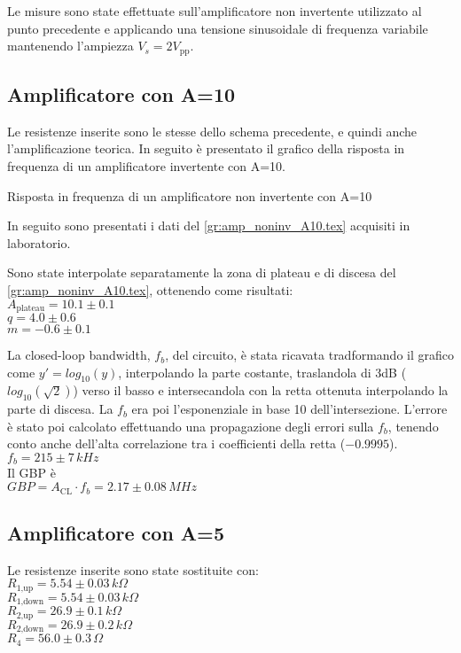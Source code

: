 Le misure sono state effettuate sull'amplificatore non invertente utilizzato al punto precedente e applicando una tensione sinusoidale 
di frequenza variabile mantenendo l'ampiezza $V_s= 2 V_\textrm{pp}$.

\subsection{Amplificatore con A=10}
Le resistenze inserite sono le stesse dello schema precedente, e quindi anche l'amplificazione teorica.
In seguito è presentato il grafico della risposta in frequenza di un amplificatore invertente con A=10.
\begin{grafico}
 \centering 
  \resizebox{\textwidth}{!}{%
 
 }%
 \caption{Risposta in frequenza di un amplificatore non invertente con A=10} 
 \label{gr:amp_noninv_A10.tex} 
\end{grafico}
In seguito sono presentati i dati del  \autoref{gr:amp_noninv_A10.tex} acquisiti in laboratorio.
%   

Sono state interpolate separatamente la zona di plateau e di discesa del \autoref{gr:amp_noninv_A10.tex}, ottenendo come risultati:\\
$A_\textrm{plateau}=10.1 \pm 0.1 $\\
$q = 4.0 \pm 0.6$\\
$m = -0.6 \pm 0.1$

La closed-loop bandwidth, $f_b$, del circuito, è stata ricavata tradformando il grafico come $y'=log_\textrm{10}(y)$, interpolando la parte costante, 
traslandola di 3dB ($log_\textrm{10}(\sqrt{2})$) verso il basso e intersecandola con la retta ottenuta interpolando la parte di discesa. La $f_b$ era poi l'esponenziale in base 10 dell'intersezione.
L'errore è stato poi calcolato effettuando una propagazione degli errori sulla $f_b$, tenendo conto anche dell'alta correlazione tra i coefficienti della retta ($-0.9995$).\\%
$f_b= 215 \pm 7 \,kHz $\\
Il GBP è\\
$GBP=A_\textrm{CL} \cdot f_b = 2.17 \pm 0.08 \,MHz$\\


\subsection{Amplificatore con A=5}
Le resistenze inserite sono state sostituite con:\\
$R_\textrm{1,up}=5.54 \pm 0.03\,k\Omega $\\ %
$R_\textrm{1,down}=5.54 \pm 0.03\,k\Omega$\\ %
$R_\textrm{2,up}=26.9 \pm 0.1\,k\Omega$\\ %
$R_\textrm{2,down}=26.9 \pm 0.2 \,k\Omega$\\
$R_4=56.0 \pm 0.3\,\Omega$

